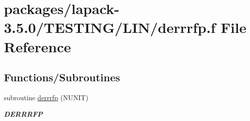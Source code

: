 \hypertarget{derrrfp_8f}{}\section{packages/lapack-\/3.5.0/\+T\+E\+S\+T\+I\+N\+G/\+L\+I\+N/derrrfp.f File Reference}
\label{derrrfp_8f}
\subsection*{Functions/\+Subroutines}
\begin{DoxyCompactItemize}
\item 
subroutine \hyperlink{group__double__lin_gada7452d95b82cd136a6be885acca86bf}{derrrfp} (N\+U\+N\+I\+T)
\begin{DoxyCompactList}\small\item\em {\bfseries D\+E\+R\+R\+R\+F\+P} \end{DoxyCompactList}\end{DoxyCompactItemize}

